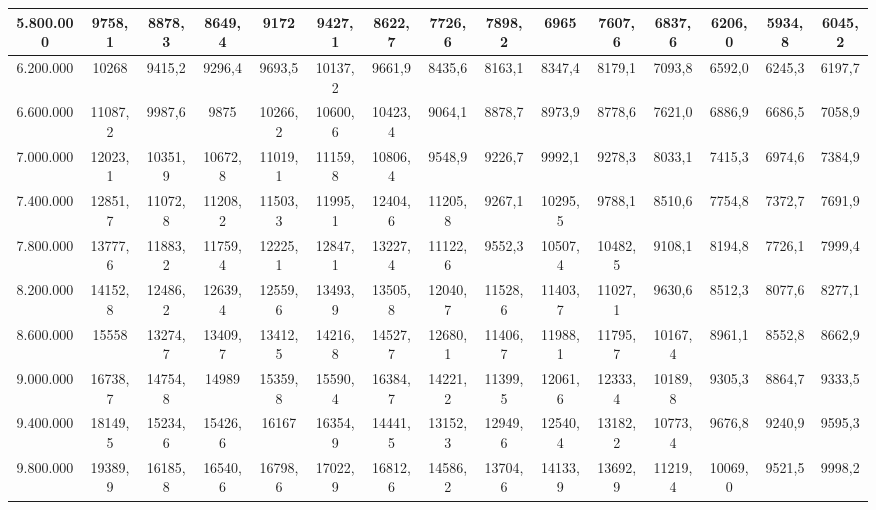 \begin{landscape}
\begin{table}[]
{\begin{tabular}{|c|c|c|c|c|c|c|c|c|c|c|c|c|c|c|}
				5.800.000 & 9758,1 & 8878,3 & 8649,4 & 9172 & 9427,1 & 8622,7 & 7726,6 & 7898,2 & 6965 & 7607,6 & 6837,6 & 6206,0 & 5934,8 & 6045,2 \\ \hline
				6.200.000 & 10268 & 9415,2 & 9296,4 & 9693,5 & 10137,2 & 9661,9 & 8435,6 & 8163,1 & 8347,4 & 8179,1 & 7093,8 & 6592,0 & 6245,3 & 6197,7 \\ \hline
				6.600.000 & 11087,2 & 9987,6 & 9875 & 10266,2 & 10600,6 & 10423,4 & 9064,1 & 8878,7 & 8973,9 & 8778,6 & 7621,0 & 6886,9 & 6686,5 & 7058,9 \\ \hline
				7.000.000 & 12023,1 & 10351,9 & 10672,8 & 11019,1 & 11159,8 & 10806,4 & 9548,9 & 9226,7 & 9992,1 & 9278,3 & 8033,1 & 7415,3 & 6974,6 & 7384,9 \\ \hline
				7.400.000 & 12851,7 & 11072,8 & 11208,2 & 11503,3 & 11995,1 & 12404,6 & 11205,8 & 9267,1 & 10295,5 & 9788,1 & 8510,6 & 7754,8 & 7372,7 & 7691,9 \\ \hline
				7.800.000 & 13777,6 & 11883,2 & 11759,4 & 12225,1 & 12847,1 & 13227,4 & 11122,6 & 9552,3 & 10507,4 & 10482,5 & 9108,1 & 8194,8 & 7726,1 & 7999,4 \\ \hline
				8.200.000 & 14152,8 & 12486,2 & 12639,4 & 12559,6 & 13493,9 & 13505,8 & 12040,7 & 11528,6 & 11403,7 & 11027,1 & 9630,6 & 8512,3 & 8077,6 & 8277,1 \\ \hline
				8.600.000 & 15558 & 13274,7 & 13409,7 & 13412,5 & 14216,8 & 14527,7 & 12680,1 & 11406,7 & 11988,1 & 11795,7 & 10167,4 & 8961,1 & 8552,8 & 8662,9 \\ \hline
				9.000.000 & 16738,7 & 14754,8 & 14989 & 15359,8 & 15590,4 & 16384,7 & 14221,2 & 11399,5 & 12061,6 & 12333,4 & 10189,8 & 9305,3 & 8864,7 & 9333,5 \\ \hline
				9.400.000 & 18149,5 & 15234,6 & 15426,6 & 16167 & 16354,9 & 14441,5 & 13152,3 & 12949,6 & 12540,4 & 13182,2 & 10773,4 & 9676,8 & 9240,9 & 9595,3 \\ \hline
				9.800.000 & 19389,9 & 16185,8 & 16540,6 & 16798,6 & 17022,9 & 16812,6 & 14586,2 & 13704,6 & 14133,9 & 13692,9 & 11219,4 & 10069,0 & 9521,5 & 9998,2 \\ \hline
			\end{tabular}%
		}
	\end{table}
	

\end{landscape}
